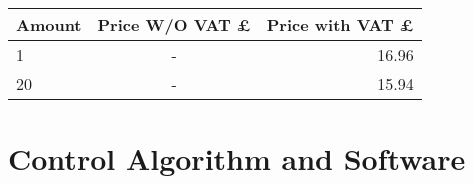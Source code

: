 \documentclass{report}
\begin{document}
\begin{center}
  \begin{tabular}{ | l | c | r |}
    \hline
    Amount & Price W/O VAT £ & Price with VAT £ \\ \hline
    1 & - & 16.96 \\ \hline
    20 & - & 15.94 \\ \hline
	\end{tabular}
\end{center}


\chapter{Control Algorithm and Software}


 
\end{document}
